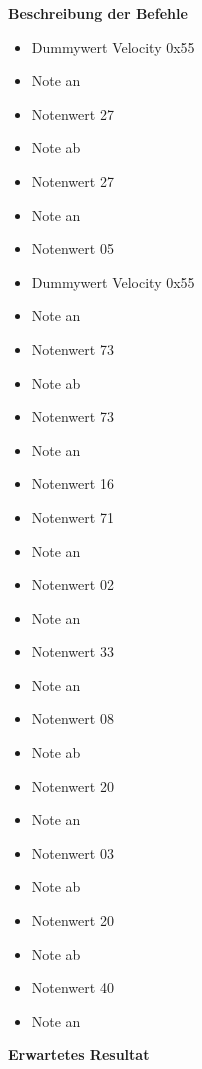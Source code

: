 \textbf{Beschreibung der Befehle}

\begin{itemize}
\item Dummywert Velocity 0x55
\item Note an 
\item Notenwert 27
\item Note ab 
\item Notenwert 27
\item Note an
\item Notenwert 05
\end{itemize}

\begin{itemize}
\item Dummywert Velocity 0x55
\item Note an
\item Notenwert 73
\item Note ab
\item Notenwert 73
\item Note an
\item Notenwert 16
\end{itemize}

\begin{itemize}
\item Notenwert 71
\item Note an
\item Notenwert 02
\item Note an
\item Notenwert 33
\item Note an
\item Notenwert 08
\item Note ab
\end{itemize}

\begin{itemize}
\item Notenwert 20
\item Note an
\item Notenwert 03
\item Note ab
\item Notenwert 20
\item Note ab
\item Notenwert 40
\item Note an
\end{itemize}

\textbf{Erwartetes Resultat}

